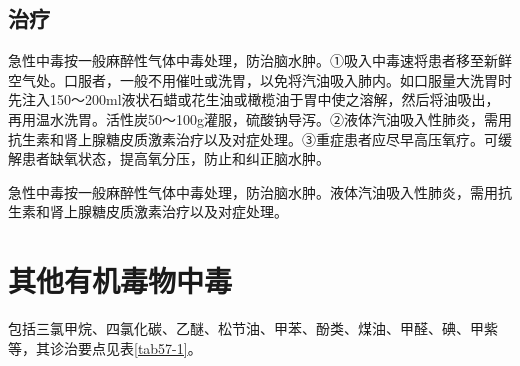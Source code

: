 \subsection{治疗}

急性中毒按一般麻醉性气体中毒处理，防治脑水肿。①吸入中毒速将患者移至新鲜空气处。口服者，一般不用催吐或洗胃，以免将汽油吸入肺内。如口服量大洗胃时先注入150～200ml液状石蜡或花生油或橄榄油于胃中使之溶解，然后将油吸出，再用温水洗胃。活性炭50～100g灌服，硫酸钠导泻。②液体汽油吸入性肺炎，需用抗生素和肾上腺糖皮质激素治疗以及对症处理。③重症患者应尽早高压氧疗。可缓解患者缺氧状态，提高氧分压，防止和纠正脑水肿。

急性中毒按一般麻醉性气体中毒处理，防治脑水肿。液体汽油吸入性肺炎，需用抗生素和肾上腺糖皮质激素治疗以及对症处理。

\protect\hypertarget{text00155.html}{}{}

\section{其他有机毒物中毒}

包括三氯甲烷、四氯化碳、乙醚、松节油、甲苯、酚类、煤油、甲醛、碘、甲紫等，其诊治要点见表\ref{tab57-1}。

